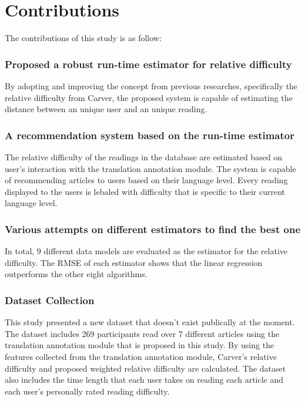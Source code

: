 \clearpage
\section{Contributions}

The contributions of this study is as follow:

\subsubsection{Proposed a robust run-time estimator for relative difficulty}
\vspace{10pt}
By adopting and improving the concept from previous researches, specifically the relative difficulty from Carver, the proposed system is capable of estimating the distance between an unique user and an unique reading.

\subsubsection{A recommendation system based on the run-time estimator}
\vspace{10pt}
The relative difficulty of the readings in the database are estimated based on user's interaction with the translation annotation module. The system is capable of recommending articles to users based on their language level. Every reading displayed to the users is lebaled with difficulty that is specific to their current language level.

\subsubsection{Various attempts on different estimators to find the best one}
\vspace{10pt}
In total, 9 different data models are evaluated as the estimator for the relative difficulty. The RMSE of each estimator shows that the linear regression outperforms the other eight algorithms.

\subsubsection{Dataset Collection}
\vspace{10pt}
This study presented a new dataset that doesn't exist publically at the moment. The dataset includes 269 participants read over 7 different articles using the translation annotation module that is proposed in this study. By using the features collected from the translation annotation module, Carver's relative difficulty and proposed weighted relative difficulty are calculated. The dataset also includes the time length that each user takes on reading each article and each user's personally rated reading difficulty.

